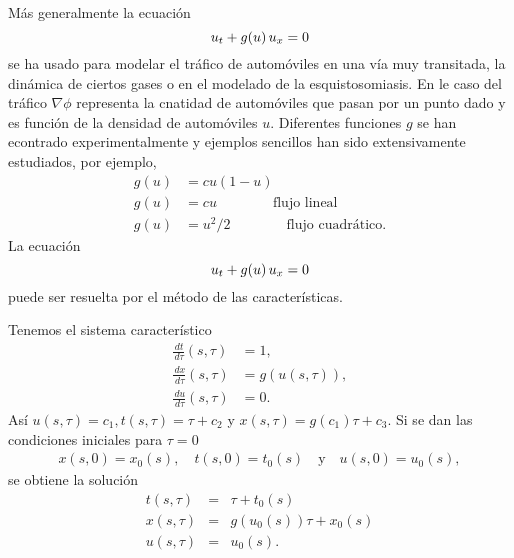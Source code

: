 Más generalmente la ecuación 
\[
u_t + g(u) \thinspace u_x = 0
\]
se ha usado para modelar el tráfico de automóviles en una vía muy transitada, la dinámica de ciertos gases o en el modelado de la esquistosomiasis. En le caso del tráfico $\nabla \phi$ representa la cnatidad de automóviles que pasan por un punto dado y es función de la densidad de automóviles $u$. Diferentes funciones $g$ se han econtrado experimentalmente y ejemplos sencillos han sido extensivamente estudiados, por ejemplo,
\begin{align*}
g(u) &= cu (1-u) \\
g(u) &= cu \qquad \qquad \text{flujo lineal} \\
g(u) &= u^2/2 \qquad \qquad \text{flujo cuadrático}.
\end{align*}
La ecuación
\begin{equation*}
u_t + g(u) \thinspace u_x =0
\end{equation*}
puede ser resuelta por el método de las características.

Tenemos el sistema característico
\begin{align*}
\frac{\,dt}{\,d\tau} (s, \tau) &= 1,\\
\frac{\,dx}{\,d\tau} (s, \tau) &= g(u(s, \tau)),\\
\frac{\,du}{\,d\tau} (s, \tau) &= 0.
\end{align*}
Así $u(s,\tau)=c_1 , t(s,\tau) = \tau+c_2$ y $x (s,\tau)=g(c_1) \tau + c_3$. 
Si se dan las condiciones iniciales para $\tau=0$
\begin{align*}
x(s,0)=x_0(s), \quad t(s,0)=t_0(s) \quad \text{y} \quad u(s,0)=u_0(s),
\end{align*}
se obtiene la solución
\begin{eqnarray*}
t(s,\tau) &=& \tau + t_0(s) \\
x(s,\tau) &=& g(u_0(s)) \tau + x_0(s) \\
u(s,\tau) &=& u_0(s).
\end{eqnarray*}

